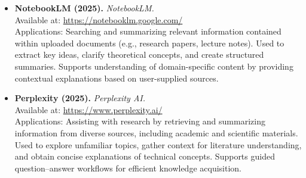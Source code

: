\begin{itemize}
    \item \textbf{NotebookLM (2025).} \textit{NotebookLM.}\\
    Available at: \url{https://notebooklm.google.com/} \\
    Applications: Searching and summarizing relevant information contained within uploaded documents (e.g., research papers, lecture notes). Used to extract key ideas, clarify theoretical concepts, and create structured summaries. Supports understanding of domain-specific content by providing contextual explanations based on user-supplied sources.

    \item \textbf{Perplexity (2025).} \textit{Perplexity AI.}\\
    Available at: \url{https://www.perplexity.ai/} \\
    Applications: Assisting with research by retrieving and summarizing information from diverse sources, including academic and scientific materials. Used to explore unfamiliar topics, gather context for literature understanding, and obtain concise explanations of technical concepts. Supports guided question--answer workflows for efficient knowledge acquisition.

\end{itemize}
